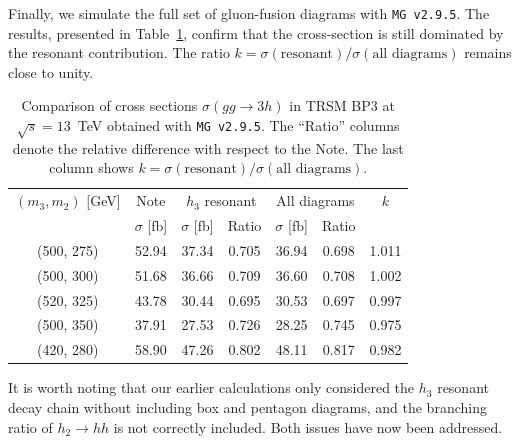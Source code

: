 \documentclass[12pt]{article}
\begin{document}
        Finally, we simulate the full set of gluon-fusion diagrams with \texttt{MG v2.9.5}. The results, presented in Table~\ref{tab:trsm_xs_comparison_all_13tev}, confirm that the cross-section is still dominated by the resonant contribution. The ratio $k = \sigma(\text{resonant}) / \sigma(\text{all diagrams})$ remains close to unity.
        \begin{table}[htpb]
            \centering
            \caption{Comparison of cross sections $\sigma(gg \to 3h)$ in TRSM BP3 at $\sqrt{s} = 13$~TeV obtained with \texttt{MG v2.9.5}. The ``Ratio'' columns denote the relative difference with respect to the Note. The last column shows $k = \sigma(\text{resonant}) / \sigma(\text{all diagrams})$.}
            \label{tab:trsm_xs_comparison_all_13tev}
            \begin{tabular}{c|c|cc|cc|c}
                $(m_3, m_2)$ [GeV] & Note & \multicolumn{2}{c|}{$h_3$ resonant} & \multicolumn{2}{c|}{All diagrams} & $k$ \\ \cline{2-7} 
                                   & $\sigma$ [fb] & $\sigma$ [fb] & Ratio & $\sigma$ [fb] & Ratio &  \\ \hline
                (500, 275) & 52.94 & 37.34 & 0.705 & 36.94 & 0.698 & 1.011 \\
                (500, 300) & 51.68 & 36.66 & 0.709 & 36.60 & 0.708 & 1.002 \\
                (520, 325) & 43.78 & 30.44 & 0.695 & 30.53 & 0.697 & 0.997 \\
                (500, 350) & 37.91 & 27.53 & 0.726 & 28.25 & 0.745 & 0.975 \\
                (420, 280) & 58.90 & 47.26 & 0.802 & 48.11 & 0.817 & 0.982
            \end{tabular}
        \end{table}

        It is worth noting that our earlier calculations only considered the $h_3$ resonant decay chain without including box and pentagon diagrams, and the branching ratio of $h_2 \to hh$ is not correctly included. Both issues have now been addressed.



\end{document}
